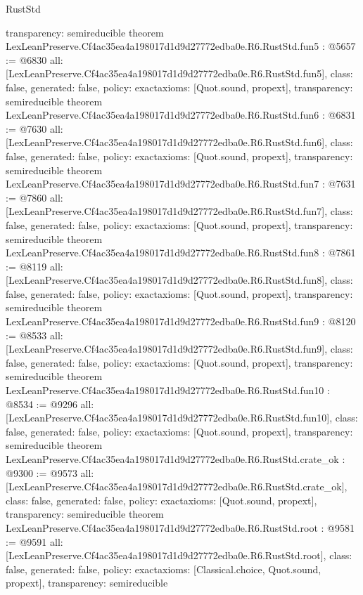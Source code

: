 \begin{lexlean}{RustStd}
\begin{coremodule}
{  transparency: semireducible
}
theorem LexLeanPreserve.Cf4ac35ea4a198017d1d9d27772edba0e.R6.RustStd.fun5 : @5657 := @6830 {
  all: [LexLeanPreserve.Cf4ac35ea4a198017d1d9d27772edba0e.R6.RustStd.fun5],
  class: false,
  generated: false,
  policy: exact{axioms: [Quot.sound, propext]},
  transparency: semireducible
}
theorem LexLeanPreserve.Cf4ac35ea4a198017d1d9d27772edba0e.R6.RustStd.fun6 : @6831 := @7630 {
  all: [LexLeanPreserve.Cf4ac35ea4a198017d1d9d27772edba0e.R6.RustStd.fun6],
  class: false,
  generated: false,
  policy: exact{axioms: [Quot.sound, propext]},
  transparency: semireducible
}
theorem LexLeanPreserve.Cf4ac35ea4a198017d1d9d27772edba0e.R6.RustStd.fun7 : @7631 := @7860 {
  all: [LexLeanPreserve.Cf4ac35ea4a198017d1d9d27772edba0e.R6.RustStd.fun7],
  class: false,
  generated: false,
  policy: exact{axioms: [Quot.sound, propext]},
  transparency: semireducible
}
theorem LexLeanPreserve.Cf4ac35ea4a198017d1d9d27772edba0e.R6.RustStd.fun8 : @7861 := @8119 {
  all: [LexLeanPreserve.Cf4ac35ea4a198017d1d9d27772edba0e.R6.RustStd.fun8],
  class: false,
  generated: false,
  policy: exact{axioms: [Quot.sound, propext]},
  transparency: semireducible
}
theorem LexLeanPreserve.Cf4ac35ea4a198017d1d9d27772edba0e.R6.RustStd.fun9 : @8120 := @8533 {
  all: [LexLeanPreserve.Cf4ac35ea4a198017d1d9d27772edba0e.R6.RustStd.fun9],
  class: false,
  generated: false,
  policy: exact{axioms: [Quot.sound, propext]},
  transparency: semireducible
}
theorem LexLeanPreserve.Cf4ac35ea4a198017d1d9d27772edba0e.R6.RustStd.fun10 : @8534 := @9296 {
  all: [LexLeanPreserve.Cf4ac35ea4a198017d1d9d27772edba0e.R6.RustStd.fun10],
  class: false,
  generated: false,
  policy: exact{axioms: [Quot.sound, propext]},
  transparency: semireducible
}
theorem LexLeanPreserve.Cf4ac35ea4a198017d1d9d27772edba0e.R6.RustStd.crate_ok : @9300 := @9573 {
  all: [LexLeanPreserve.Cf4ac35ea4a198017d1d9d27772edba0e.R6.RustStd.crate_ok],
  class: false,
  generated: false,
  policy: exact{axioms: [Quot.sound, propext]},
  transparency: semireducible
}
theorem LexLeanPreserve.Cf4ac35ea4a198017d1d9d27772edba0e.R6.RustStd.root : @9581 := @9591 {
  all: [LexLeanPreserve.Cf4ac35ea4a198017d1d9d27772edba0e.R6.RustStd.root],
  class: false,
  generated: false,
  policy: exact{axioms: [Classical.choice, Quot.sound, propext]},
  transparency: semireducible
}


\end{coremodule}
\end{lexlean}
